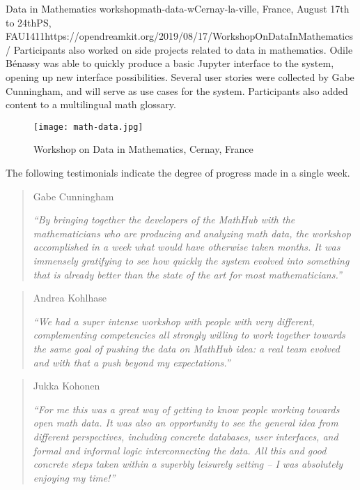 \begin{event}{Data in Mathematics workshop}{math-data-w}{Cernay-la-ville, France, August 17th to 24th}{PS, FAU}{14}{11}{https://opendreamkit.org/2019/08/17/WorkshopOnDataInMathematics/}
Participants also worked on side projects related to data in mathematics.
Odile Bénassy was able to quickly produce a basic Jupyter interface to the system,
opening up new interface possibilities.
Several user stories were collected by Gabe Cunningham, and will serve as use cases for the system.
Participants also added content to a multilingual math glossary.

\begin{figure}[ht]
  \texttt{[image: math-data.jpg]}
  \caption*{Workshop on Data in Mathematics, Cernay, France}
\end{figure}

The following testimonials indicate the degree of progress made in a single week.

\begin{quote}
Gabe Cunningham

\emph{``By bringing together the developers of the MathHub with the mathematicians who are producing and analyzing math data, the workshop accomplished in a week what would have otherwise taken months. It was immensely gratifying to see how quickly the system evolved into something that is already better than the state of the art for most mathematicians.''}
\end{quote}
\vspace{5mm}

\begin{quote}
Andrea Kohlhase

\emph{``We had a super intense workshop with people with very different, complementing competencies all strongly willing to work together towards the same goal of pushing the data on MathHub idea: a real team evolved and with that a push beyond my expectations.''}
\end{quote}
\vspace{5mm}

\begin{quote}
Jukka Kohonen

\emph{``For me this was a great way of getting to know people working towards open math data. It was also an opportunity to see the general idea from different perspectives, including concrete databases, user interfaces, and formal and informal logic interconnecting the data. All this and good concrete steps taken within a superbly leisurely setting -- I was absolutely enjoying my time!''}
\end{quote}


\end{event}
